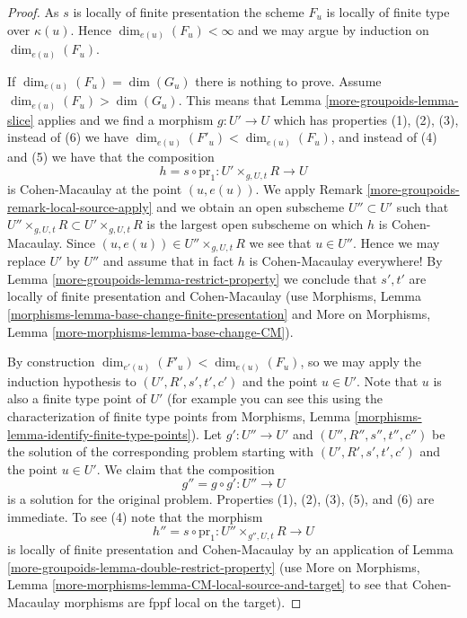 \begin{proof}
As $s$ is locally of finite presentation the scheme $F_u$ is
locally of finite type over $\kappa(u)$. Hence
$\dim_{e(u)}(F_u) < \infty$ and we may argue by induction on
$\dim_{e(u)}(F_u)$.

\medskip\noindent
If $\dim_{e(u)}(F_u) = \dim(G_u)$ there is nothing to prove.
Assume $\dim_{e(u)}(F_u) > \dim(G_u)$. This means that
Lemma \ref{more-groupoids-lemma-slice}
applies and we find a morphism $g : U' \to U$ which has
properties (1), (2), (3), instead of (6) we have
$\dim_{e(u)}(F'_u) < \dim_{e(u)}(F_u)$,
and instead of (4) and (5) we have that the composition
$$
h = s \circ \text{pr}_1 : U' \times_{g, U, t} R \longrightarrow U
$$
is Cohen-Macaulay at the point $(u, e(u))$. We apply
Remark \ref{more-groupoids-remark-local-source-apply}
and we obtain an open subscheme $U'' \subset U'$ such that
$U'' \times_{g, U, t} R \subset U' \times_{g, U, t} R$
is the largest open subscheme on which $h$ is Cohen-Macaulay.
Since $(u, e(u)) \in U'' \times_{g, U, t} R$ we see that $u \in U''$.
Hence we may replace $U'$ by $U''$ and assume that in fact $h$ is
Cohen-Macaulay everywhere! By
Lemma \ref{more-groupoids-lemma-restrict-property}
we conclude that $s', t'$ are locally of finite
presentation and Cohen-Macaulay (use
Morphisms, Lemma \ref{morphisms-lemma-base-change-finite-presentation}
and
More on Morphisms, Lemma \ref{more-morphisms-lemma-base-change-CM}).

\medskip\noindent
By construction $\dim_{e'(u)}(F'_u) < \dim_{e(u)}(F_u)$,
so we may apply the induction hypothesis to $(U', R', s', t', c')$
and the point $u \in U'$. Note that $u$ is also a finite type point
of $U'$ (for example you can see this using the characterization of
finite type points from
Morphisms, Lemma \ref{morphisms-lemma-identify-finite-type-points}).
Let $g' : U'' \to U'$ and $(U'', R'', s'', t'', c'')$ be the solution
of the corresponding problem starting with $(U', R', s', t', c')$
and the point $u \in U'$. We claim that the composition
$$
g'' = g \circ g' : U'' \longrightarrow U
$$
is a solution for the original problem. Properties (1), (2), (3), (5),
and (6) are immediate. To see (4) note that the morphism
$$
h'' = s \circ \text{pr}_1 : U'' \times_{g'', U, t} R \longrightarrow U
$$
is locally of finite presentation and Cohen-Macaulay by an application of
Lemma \ref{more-groupoids-lemma-double-restrict-property}
(use
More on Morphisms, Lemma \ref{more-morphisms-lemma-CM-local-source-and-target}
to see that Cohen-Macaulay morphisms are fppf local on the target).
\end{proof}

